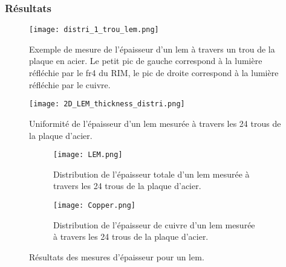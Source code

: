       \subsubsection{Résultats}\label{sec::thickness_result}
         
        \begin{figure}[!htb]
          \centering
          \texttt{[image: distri\_1\_trou\_lem.png]}
          \caption[Exemple de mesure de l'épaisseur d'un LEM]{\label{fig::distri_1_trou_lem}Exemple de mesure de l'épaisseur d'un \gls{lem} à travers un trou de la plaque en acier. Le petit pic de gauche correspond à la lumière réfléchie par le \gls{fr4} du RIM, le pic de droite correspond à la lumière réfléchie par le cuivre.}
        \end{figure}
        \begin{figure}[!htb]
          \centering
          \texttt{[image: 2D\_LEM\_thickness\_distri.png]}
          \caption[Uniformité de l'épaisseur d'un LEM]{\label{fig::distri_24_trou_lem_2D}Uniformité de l'épaisseur d'un \gls{lem} mesurée à travers les 24 trous de la plaque d'acier.}
        \end{figure}
          
        \begin{figure}[!htb]
          \begin{subfigure}[b]{0.48\textwidth}
            \texttt{[image: LEM.png]}
            \caption{\label{fig::distri_24_trou_lem_1D}Distribution de l'épaisseur totale d'un \gls{lem} mesurée à travers les 24 trous de la plaque d'acier.}
          \end{subfigure}
          \hfill
          \begin{subfigure}[b]{0.48\textwidth}
            \texttt{[image: Copper.png]}
            \caption{\label{fig::distri_24_trou_cuivre_1D}Distribution de l'épaisseur de cuivre d'un \gls{lem} mesurée à travers les 24 trous de la plaque d'acier.}
          \end{subfigure}
          \caption[Résultats des mesures d'épaisseur pour un LEM]{\label{fig::distri_epaisseur_1_lem}Résultats des mesures d'épaisseur pour un \gls{lem}.}
        \end{figure}
                
